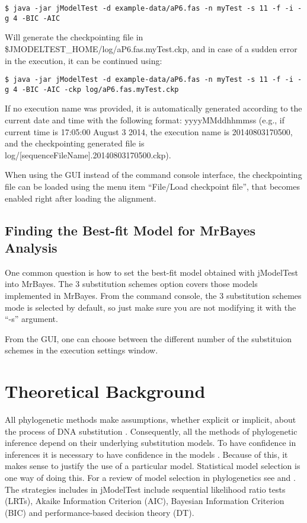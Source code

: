 \documentclass[11pt,twoside,a4paper]{article}
\begin{document}
\begin{lstlisting}
$ java -jar jModelTest -d example-data/aP6.fas -n myTest -s 11 -f -i -g 4 -BIC -AIC
\end{lstlisting}

Will generate the checkpointing file in \$JMODELTEST\_HOME/log/aP6.fas.myTest.ckp, and in case of a sudden error in the execution, it can be continued using:

\begin{lstlisting}
$ java -jar jModelTest -d example-data/aP6.fas -n myTest -s 11 -f -i -g 4 -BIC -AIC -ckp log/aP6.fas.myTest.ckp
\end{lstlisting}

If no execution name was provided, it is automatically generated according to the current date and time with the following format: yyyyMMddhhmmss (e.g., if current time is 17:05:00 August 3 2014, the execution name is 20140803170500, and the checkpointing generated file is log/[sequenceFileName].20140803170500.ckp).

When using the GUI instead of the command console interface, the checkpointing file can be loaded using the menu item ``File/Load checkpoint file'', that becomes enabled right after loading the alignment.

\subsection{Finding the Best-fit Model for MrBayes Analysis}

One common question is how to set the best-fit model obtained with jModelTest into MrBayes. The 3 substitution schemes option covers those models implemented in MrBayes. From the command console, the 3 substitution schemes mode is selected by default, so just make sure you are not modifying it with the ``-s'' argument.

From the GUI, one can choose between the different number of the substituion schemes in the execution settings window.


\section{Theoretical Background}

All phylogenetic methods make assumptions, whether explicit or implicit, about the process of DNA substitution \citep{Felsenstein-1988}. Consequently, all the methods of phylogenetic inference depend on their underlying substitution models. To have confidence in inferences it is necessary to have confidence in the models \citep{Goldman-1993b}. Because of this, it makes sense to justify the use of a particular model. Statistical model selection is one way of doing this. For a review of model selection in phylogenetics see \citet{Sullivan-2005} and \citet{Johnson-2003}. The strategies includes in jModelTest include sequential likelihood ratio tests (LRTs), Akaike Information Criterion (AIC), Bayesian Information Criterion (BIC) and performance-based decision theory (DT).
\end{document}
